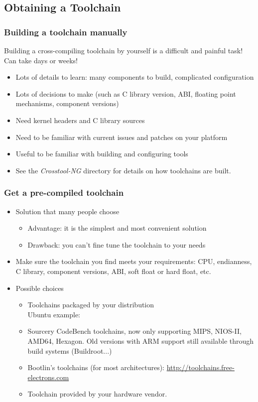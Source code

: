 \subsection{Obtaining a Toolchain}

\begin{frame}
  \frametitle{Building a toolchain manually}

  Building a cross-compiling toolchain by yourself is a difficult and painful
  task! Can take days or weeks!
  \begin{itemize}
  \item Lots of details to learn: many components to build, complicated
    configuration
  \item Lots of decisions to make (such as C library version, ABI, floating point
    mechanisms, component versions)
  \item Need kernel headers and C library sources
  \item Need to be familiar with current  issues and patches
    on your platform
  \item Useful to be familiar with building and configuring tools
  \item See the {\em Crosstool-NG}  directory for details
    on how toolchains are built.
\end{itemize}
\end{frame}

\begin{frame}
  \frametitle{Get a pre-compiled toolchain}
  \begin{itemize}
  \item Solution that many people choose
    \begin{itemize}
    \item Advantage: it is the simplest and most convenient solution
    \item Drawback: you can't fine tune the toolchain to your needs
    \end{itemize}
  \item Make sure the toolchain you find meets your requirements:
    CPU, endianness, C library, component versions, ABI, soft float
    or hard float, etc.
  \item Possible choices
    \begin{itemize}
    \item Toolchains packaged by your distribution\\
	  Ubuntu example:\\
    \item Sourcery CodeBench toolchains, now only supporting MIPS,
	  NIOS-II, AMD64, Hexagon. Old versions with ARM support still
	  available through build systems (Buildroot...)
    \item Bootlin's toolchains (for most architectures):
          \url{http://toolchains.free-electrons.com} 
    \item Toolchain provided by your hardware vendor.
    \end{itemize}
  \end{itemize}
\end{frame}

